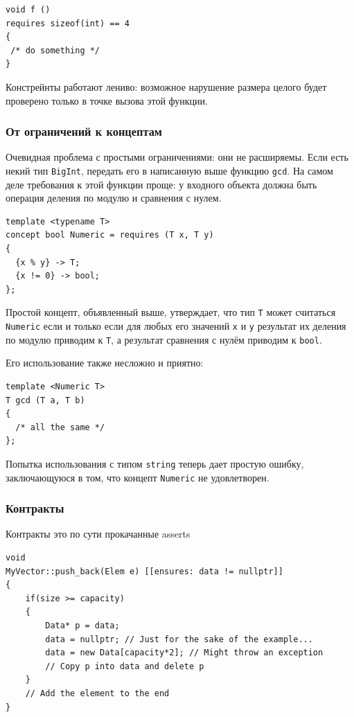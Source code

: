 \documentclass[a4paper,12pt,oneside]{article}
\begin{document}
\begin{lstlisting}
void f ()
requires sizeof(int) == 4
{
 /* do something */
}
\end{lstlisting}

Констрейнты работают лениво: возможное нарушение размера целого будет проверено только в точке вызова этой функции.

\subsubsection{От ограничений к концептам}

Очевидная проблема с простыми ограничениями: они не расширяемы. Если есть некий тип \lstinline!BigInt!, передать его в написанную выше функцию \lstinline!gcd!. На самом деле требования к этой функции проще: у входного объекта должна быть операция деления по модулю и сравнения с нулем.

\begin{lstlisting}
template <typename T>
concept bool Numeric = requires (T x, T y)
{
  {x % y} -> T;
  {x != 0} -> bool;
};
\end{lstlisting}

Простой концепт, объявленный выше, утверждает, что тип \lstinline!T! может считаться \lstinline!Numeric! если и только если для любых его значений \lstinline!x! и \lstinline!y! результат их деления по модулю приводим к \lstinline!T!, а результат сравнения с нулём приводим к \lstinline!bool!.

Его использование также несложно и приятно:

\begin{lstlisting}
template <Numeric T>
T gcd (T a, T b)
{
  /* all the same */
};
\end{lstlisting}

Попытка использования с типом \lstinline!string! теперь дает простую ошибку, заключающуюся в том, что концепт \lstinline!Numeric! не удовлетворен.

\subsubsection{Контракты}\label{Contracts}

Контракты это по сути прокачанные asserts

\begin{lstlisting}
void 
MyVector::push_back(Elem e) [[ensures: data != nullptr]]
{
    if(size >= capacity)
    {
        Data* p = data;
        data = nullptr; // Just for the sake of the example...
        data = new Data[capacity*2]; // Might throw an exception
        // Copy p into data and delete p
    }
    // Add the element to the end
}
\end{lstlisting}
\end{document}
